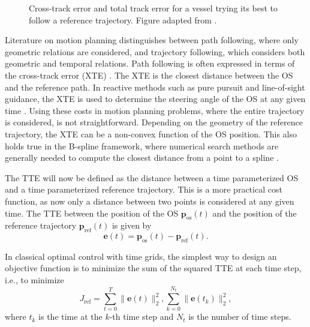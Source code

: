 \begin{figure}
    \centering
    
    \caption{Cross-track error and total track error for a vessel trying its best to follow a reference trajectory. Figure adapted from \cite{prosjektoppgave}.}
    \label{fig:cross-track-along-track-error}
\end{figure}

Literature on motion planning distinguishes between path following, where only geometric relations are considered, and trajectory following, which considers both geometric and temporal relations. 
Path following is often expressed in terms of the cross-track error (XTE) \citep{Fossen2011-Handbook}. The XTE is the closest distance between the \acrshort{OS} and the reference path. In reactive methods such as pure pursuit and line-of-sight guidance, the XTE is used to determine the steering angle of the \acrshort{OS} at any given time \citep{Fossen2011-Handbook}. 
Using these costs in motion planning problems, where the entire trajectory is considered, is not straightforward. Depending on the geometry of the reference trajectory, the XTE can be a non-convex function of the OS position. This also holds true in the B-spline framework, where numerical search methods are generally needed to compute the closest distance from a point to a spline \citep{johnson2005distance,hu2005second,chen2009computing}.

The \acrfull{TTE} will now be defined as the distance between a time parameterized OS and a time parameterized reference trajectory. This is a more practical cost function, as now only a distance between two points is considered at any given time. The TTE between the position of the OS $\mathbf p_\text{os}(t)$ and the position of the reference trajectory $\mathbf p_\text{ref}(t)$ is given by
\begin{equation}\label{eq:total-track-error}
    \mathbf e(t) = \mathbf p_\text{os}(t) - \mathbf p_\text{ref}(t).
\end{equation}

In classical optimal control with time grids, the simplest way to design an objective function is to minimize the sum of the squared TTE at each time step, i.e., to minimize
\begin{equation}\label{eq:total-track-error-time-grid}
    J_\text{ref} = \sum_{t=0}^{T} \|\mathbf e(t)\|_2^2,
    \sum_{k=0}^{N_t} \|\mathbf e(t_k)\|_2^2,
\end{equation}
where $t_k$ is the time at the $k$-th time step and $N_t$ is the number of time steps. 

